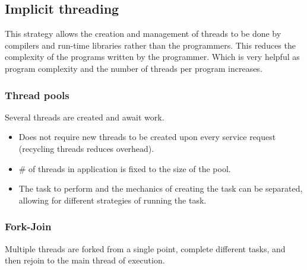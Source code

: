 \subsection{Implicit threading}

This strategy allows the creation and management of threads
to be done by compilers and run-time libraries rather than the programmers.
This reduces the complexity of the programs written by the programmer.
Which is very helpful as program complexity and the number of threads per program
increases.


\subsubsection{Thread pools}

Several threads are created and await work.

\begin{itemize}
    \item Does not require new threads to be created upon every service request (recycling threads reduces overhead).
    \item \# of threads in application is fixed to the size of the pool.
    \item The task to perform and the mechanics of creating the task can be separated, allowing for different strategies of running the task.
\end{itemize}


\subsubsection{Fork-Join}

Multiple threads are forked from a single point, complete different tasks, and then rejoin to the main thread of execution.
